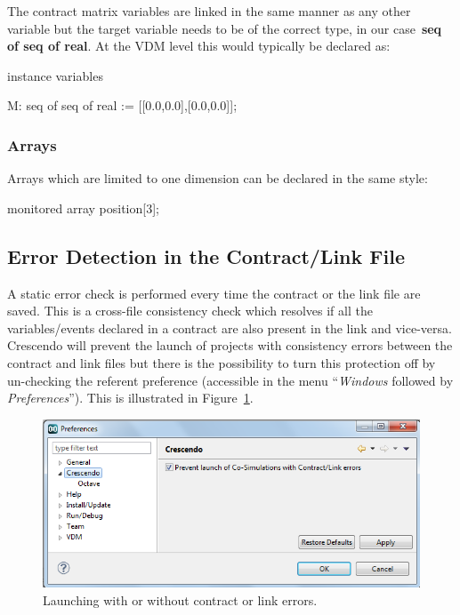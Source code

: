 \documentclass{crescendorepchap}
\newcommand{\vdmkeyw}[1]{{\bf\ttfamily #1}}
\begin{document}
The contract matrix variables are linked in the same manner as any other
variable but the target variable needs to be of the correct type, in our
case~\vdmkeyw{seq of seq of real}. At the VDM level this would typically 
be declared as:

\begin{vdmrt}
instance variables

    M: seq of seq of real := [[0.0,0.0],[0.0,0.0]];
\end{vdmrt}

\subsubsection{Arrays}

Arrays which are limited to one dimension can be declared in the same style: 

\begin{dcl}
monitored array position[3];
\end{dcl}



\subsection{Error Detection in the Contract/Link File}

A static error check is performed every time the contract or the
link file are saved. This is a
cross-file consistency check which resolves if all the variables/events
declared in a contract are also present in the link and vice-versa.
Crescendo will prevent the launch of projects with consistency errors
between the contract and link files but there is the possibility to turn
this protection off by un-checking the referent preference (accessible
in the menu ``\emph{Windows} followed by \emph{Preferences}''). This is illustrated in Figure~\ref{fig:linkerrors}.

\begin{figure}[htbp]
\centering
\includegraphics[width=.8\textwidth]{images/DestecsPreferences.png}
\caption{Launching with or without contract or link errors.\label{fig:linkerrors}}
\end{figure}
\end{document}
